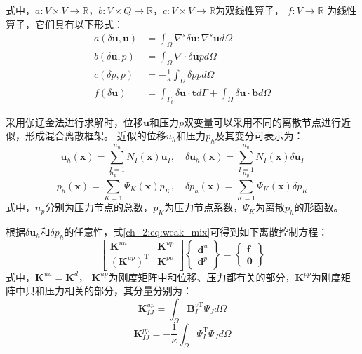 式中，$a: V\times V\rightarrow \mathbb R$，$b: V\times Q\rightarrow \mathbb R$，$c: V\times V\rightarrow \mathbb R$为双线性算子， $f: V \rightarrow \mathbb R$ 为线性算子，它们具有以下形式：
\begin{align}
    a(\delta \boldsymbol u, \boldsymbol u) &= \int_\Omega \nabla^s \delta \boldsymbol u: \nabla^s \boldsymbol u d\Omega \\
    b(\delta \boldsymbol u, p) &= \int_\Omega \nabla \cdot \delta \boldsymbol u p d\Omega \\
    c(\delta p,p) &= -\frac{1}{\kappa}\int_\Omega\delta p p d\Omega \\
    f(\delta \boldsymbol u) &= \int_{\Gamma_t} \delta \boldsymbol u \cdot \boldsymbol t d\Gamma + \int_{\Omega} \delta \boldsymbol u \cdot \boldsymbol b d\Omega
\end{align}

采用伽辽金法进行求解时，位移$\boldsymbol u$和压力$p$双变量可以采用不同的离散节点进行近似，形成混合离散框架。
近似的位移$u_h$和压力$p_h$及其变分可表示为：
\begin{equation}\label{ch_2:eq:u_h_mix}
    \boldsymbol u_h(\boldsymbol x) = \sum_{I=1}^{n_u} N_I(\boldsymbol x) \boldsymbol u_I, \quad
    \delta \boldsymbol u_h(\boldsymbol x) = \sum_{I=1}^{n_u} N_I(\boldsymbol x) \delta \boldsymbol u_I
\end{equation}
\begin{equation}\label{ch_2:eq:p_h_mix}
    p_h(\boldsymbol x) = \sum_{K=1}^{n_p} \Psi_K(\boldsymbol x) p_K, \quad
    \delta p_h(\boldsymbol x) = \sum_{K=1}^{n_p} \Psi_K(\boldsymbol x) \delta p_K
\end{equation}
式中，$n_p$分别为压力节点的总数，$p_K$为压力节点系数，$\Psi_K$为离散$p_h$的形函数。

根据$\delta \boldsymbol  u_h$和$\delta p_h$的任意性，式\eqref{ch_2:eq:weak_mix}可得到如下离散控制方程：
\begin{equation}\label{ch_2:eq:equilibrium_mix}
    \begin{bmatrix}
        \boldsymbol K^{uu} & \boldsymbol K^{up} \\ (\boldsymbol K^{up})^{\mathrm T} & \boldsymbol K^{pp}
    \end{bmatrix}
    \begin{Bmatrix}
        \boldsymbol d^u \\ \boldsymbol d^p 
    \end{Bmatrix} =
    \begin{Bmatrix}
        \boldsymbol f \\ \boldsymbol 0 
    \end{Bmatrix}
\end{equation}
式中，$\boldsymbol K^{uu} = \boldsymbol K^d$， $\boldsymbol{K}^{up}$为刚度矩阵中和位移、压力都有关的部分，$\boldsymbol{K}^{pp}$为刚度矩阵中只和压力相关的部分，其分量分别为：
\begin{equation}
    \boldsymbol{K}^{up}_{I J}=\int_{\Omega} \boldsymbol B_{I}^{v\mathrm T} \Psi_{J} {d} \Omega
\end{equation}
\begin{equation}  
    \boldsymbol{K}^{pp}_{IJ}=-\frac{1}{\kappa}\int_{\Omega}  \Psi^\mathrm{T}_{I}  \Psi_{J}d\Omega
\end{equation}

